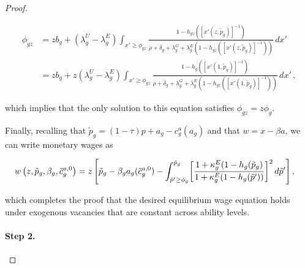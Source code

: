 \begin{proof}
    \begin{small}
        \begin{align}
            \phi_{gz} %
            &= z b_{g} + (\lambda_{g}^{U} - \lambda_{g}^{E}) \int_{x' \ge \phi_{gz}} \frac{1 - h_{gz}([x'(z,\tilde{p}_{g})]^{-1})}{\rho + \delta_{g} + \lambda_{g}^{G} + \lambda_{g}^{E} (1 - h_{gz}([x'(z,\tilde{p}_{g})]^{-1}))} \, d x' \\
            &= z b_{g} + z (\lambda_{g}^{U} - \lambda_{g}^{E}) \int_{x' \ge \phi_{gz}} \frac{1 - h_{g}([x'(1,\tilde{p}_{g})]^{-1})}{\rho + \delta_{g} + \lambda_{g}^{G} + \lambda_{g}^{E} (1 - h_{gz}([x'(1,\tilde{p}_{g})]^{-1}))} \, d x' \, ,
        \end{align}
    \end{small}
    which implies that the only solution to this equation satisfies $\phi_{gz} = z \phi_{g}$.

    Finally, recalling that $\tilde{p}_{g} = (1-\tau) p + a_{g} - c_{g}^{a}(a_{g})$ and that $w = x - \beta a$, we can write monetary wages as
    \begin{small}
        \begin{align}
            w\left(z,\tilde{p}_{g},\beta_{g},\tilde{c}_{g}^{a,0}\right) &= %
            z \left[ \tilde{p}_{g} - \beta_{g} a_{g}(\tilde{c}_{g}^{a,0})%
            - \int_{\tilde{p}' \ge \phi_{g}}^{\tilde{p}_{g}} \biggl{[} \frac{1 + \kappa_{g}^{E} (1 - h_{g} (\tilde{p}_{g})}{1 + \kappa_{g}^{E} (1 - h_{g} (\tilde{p}'))} \biggr{]}^2  \, d \tilde{p}' \right], \label{eq:wage_equation_app}
        \end{align}
    \end{small}
    which completes the proof that the desired equilibrium wage equation holds under exogenous vacancies that are constant across ability levels.


    \paragraph{Step 2.}


\end{proof}

